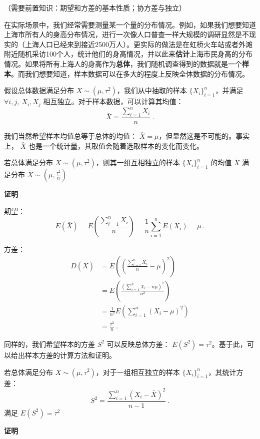 
\begin{issues}
\issueDraft
\issueMissDepend
\end{issues}
（需要前置知识：期望和方差的基本性质；协方差与独立）

在实际场景中，我们经常需要测量某一个量的分布情况。例如，如果我们想要知道上海市所有人的身高分布情况，进行一次像人口普查一样大规模的调研显然是不现实的（上海人口已经来到接近2500万人）。更实际的做法是在虹桥火车站或者外滩附近随机采访100个人，统计他们的身高情况，并以此来\textbf{估计}上海市民身高的分布情况。如果将所有上海人的身高作为\textbf{总体}，我们随机调查得到的数据就是一个\textbf{样本}。而我们想要知道，样本数据可以在多大的程度上反映全体数据的分布情况。

假设总体数据满足分布 $X\sim(\mu, \tau^2)$，我们从中抽取的样本 $\{X_i \}_{i=1}^n$，并满足 $\forall i,j,\ X_i,X_j$ 相互独立。对于样本数据，可以计算其均值：\begin{equation}
\bar X=\frac{\sum_{i=1}^n X_i}{n}~.
\end{equation}

我们当然希望样本均值总等于总体的均值： $\bar X=\mu$，但显然这是不可能的。事实上， $\bar X$ 也是一个统计量，其取值会随着选取样本的变化而变化。

\begin{theorem}{}
若总体满足分布 $X\sim (\mu, \tau^2)$，则其一组互相独立的样本 $\{X_i \}_{i=1}^n$ 的均值 $\bar X$ 满足分布 $\bar X\sim (\mu, \frac{\tau^2}{n})$
\end{theorem}
\textbf{证明}

期望：
\begin{equation}
E(\bar X) =E(\frac{\sum_{i=1}^n X_i}{n}) 
        =\frac 1 n \sum_{i=1}^n E(X_i)=\mu~.
\end{equation}

方差：
\begin{equation}
\begin{aligned}
D(\bar X) &=E((\frac{\sum_{i=1}^n X_i}{n}-\mu)^2)\\
&= E(\frac{(\sum_{i=1}^n X_i-n \mu)^2}{n^2}) \\
&=\frac {1} {n^2} E(\sum_{i=1}^n (X_i-\mu)^2) \\
&=\frac {\tau^2}{n}~.
\end{aligned}
\end{equation}

同样的，我们希望样本的方差 $S^2$ 可以反映总体方差： $E(S^2)=\tau^2$。基于此，可以给出样本方差的计算方法和证明。
\begin{theorem}{}
若总体满足分布 $X\sim (\mu, \tau^2)$，对于一组相互独立的样本 $\{X_i \}_{i=1}^n$，其统计方差：
\begin{equation}
S^2 = \frac{\sum_{i=1}^n (X_i-\bar X)^2}{n-1}~.
\end{equation}
满足 $E(S^2) = \tau^2$
\end{theorem}
\textbf{证明}

